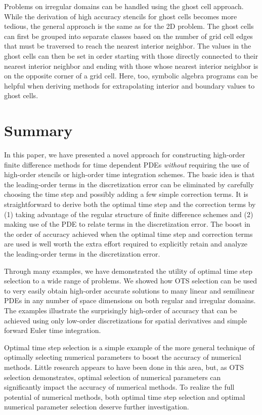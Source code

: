 \documentclass[fleqn,12pt,twoside]{article}
\begin{document}
Problems on irregular domains can be handled using the ghost cell approach. 
While the derivation of high accuracy stencils for ghost cells becomes more
tedious, the general approach is the same as for the 2D problem.  The ghost 
cells can first be grouped into separate classes based on the number of 
grid cell edges that must be traversed to reach the nearest interior neighbor.
The values in the ghost cells can then be set in order starting with those 
directly connected to their nearest interior neighbor and ending with those 
whose nearest interior neighbor is on the opposite corner of a grid cell.
Here, too, symbolic algebra programs can be helpful when deriving methods for 
extrapolating interior and boundary values to ghost cells.


\section{\label{sec:summary} Summary} 
In this paper, we have presented a novel approach for constructing high-order
finite difference methods for time dependent PDEs \emph{without} requiring
the use of high-order stencils or high-order time integration schemes.  
The basic idea is that the leading-order terms in the discretization error
can be eliminated by carefully choosing the time step and possibly adding
a few simple correction terms.  It is straightforward to derive both the 
optimal time step and the correction terms by (1) taking advantage of the 
regular structure of finite difference schemes and (2) making use of the
PDE to relate terms in the discretization error.  The boost in the order
of accuracy achieved when the optimal time step and correction terms are
used is well worth the extra effort required to explicitly retain and analyze 
the leading-order terms in the discretization error.   

Through many examples, we have demonstrated the utility of optimal time step
selection to a wide range of problems.  We showed how OTS selection can be 
used to very easily obtain high-order accurate solutions to many linear 
and semilinear PDEs in any number of space dimensions on both regular
and irregular domains.  The examples illustrate the surprisingly high-order
of accuracy that can be achieved using only low-order discretizations for 
spatial derivatives and simple forward Euler time integration.

Optimal time step selection is a simple example of the more general technique
of optimally selecting numerical parameters to boost the accuracy of 
numerical methods.  Little research appears to have been done in this area,
but, as OTS selection demonstrates, optimal selection of numerical parameters 
can significantly impact the accuracy of numerical methods.  To realize
the full potential of numerical methods, both optimal time step selection 
and optimal numerical parameter selection deserve further investigation.
\end{document}
